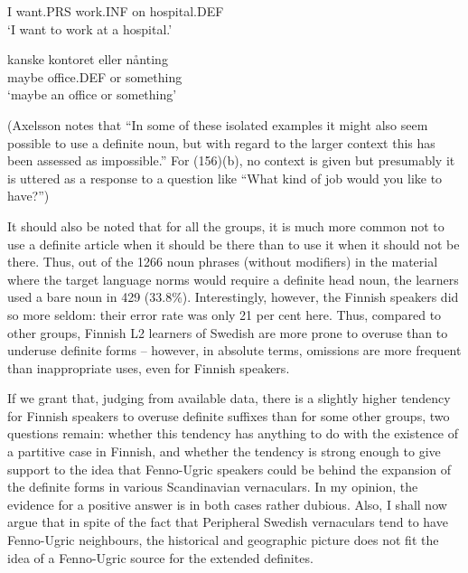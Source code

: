 I  want.PRS  work.INF  on  hospital.DEF\\

\glt ‘I want to work at a hospital.’

\z

\item 


 \ea\label{}
\gll kanske  kontoret  eller  nånting\\


maybe  office.DEF  or  something\\

\glt ‘maybe an office or something’ 

\z

(Axelsson notes that “In some of these isolated examples it might also seem possible to use a definite noun, but with regard to the larger context this has been assessed as impossible.” For (156)(b), no context is given but presumably it is uttered as a response to a question like “What kind of job would you like to have?”)


It should also be noted that for all the groups, it is much more common not to use a definite article when it should be there than to use it when it should not be there. Thus, out of the 1266 noun phrases (without modifiers) in the material where the target language norms would require a definite head noun, the learners used a bare noun in 429 (33.8\%). Interestingly, however, the Finnish speakers did so more seldom: their error rate was only 21 per cent here. Thus, compared to other groups, Finnish L2 learners of Swedish are more prone to overuse than to underuse definite forms – however, in absolute terms, omissions are more frequent than inappropriate uses, even for Finnish speakers.  


If we grant that, judging from available data, there is a slightly higher tendency for Finnish speakers to overuse definite suffixes than for some other groups, two questions remain: whether this tendency has anything to do with the existence of a partitive case in Finnish, and whether the tendency is strong enough to give support to the idea that Fenno-Ugric speakers could be behind the expansion of the definite forms in various Scandinavian vernaculars. In my opinion, the evidence for a positive answer is in both cases rather dubious. Also, I shall now argue that in spite of the fact that Peripheral Swedish vernaculars tend to have Fenno-Ugric neighbours, the historical and geographic picture does not fit the idea of a Fenno-Ugric source for the extended definites.

